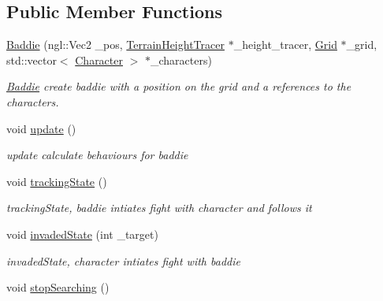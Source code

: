 \subsection*{Public Member Functions}
\begin{DoxyCompactItemize}
\item 
\hyperlink{class_baddie_a748dc5a3026f75412dbff8d21e33fee0}{Baddie} (ngl\+::\+Vec2 \+\_\+pos, \hyperlink{class_terrain_height_tracer}{Terrain\+Height\+Tracer} $\ast$\+\_\+height\+\_\+tracer, \hyperlink{class_grid}{Grid} $\ast$\+\_\+grid, std\+::vector$<$ \hyperlink{class_character}{Character} $>$ $\ast$\+\_\+characters)
\begin{DoxyCompactList}\small\item\em \hyperlink{class_baddie}{Baddie} create baddie with a position on the grid and a references to the characters. \end{DoxyCompactList}\item 
\hypertarget{class_baddie_a4186db9e136db274323cffd1c6d8b317}{}void \hyperlink{class_baddie_a4186db9e136db274323cffd1c6d8b317}{update} ()\label{class_baddie_a4186db9e136db274323cffd1c6d8b317}

\begin{DoxyCompactList}\small\item\em update calculate behaviours for baddie \end{DoxyCompactList}\item 
\hypertarget{class_baddie_ab6483fa4a6e34da1f0b226dccc58a929}{}void \hyperlink{class_baddie_ab6483fa4a6e34da1f0b226dccc58a929}{tracking\+State} ()\label{class_baddie_ab6483fa4a6e34da1f0b226dccc58a929}

\begin{DoxyCompactList}\small\item\em tracking\+State, baddie intiates fight with character and follows it \end{DoxyCompactList}\item 
\hypertarget{class_baddie_ab743103a8081194f40467d4c53b01249}{}void \hyperlink{class_baddie_ab743103a8081194f40467d4c53b01249}{invaded\+State} (int \+\_\+target)\label{class_baddie_ab743103a8081194f40467d4c53b01249}

\begin{DoxyCompactList}\small\item\em invaded\+State, character intiates fight with baddie \end{DoxyCompactList}\item 
\hypertarget{class_baddie_a081b30d002df632d9fe3285dc8cca125}{}void \hyperlink{class_baddie_a081b30d002df632d9fe3285dc8cca125}{stop\+Searching} ()\label{class_baddie_a081b30d002df632d9fe3285dc8cca125}


\end{DoxyCompactItemize}
